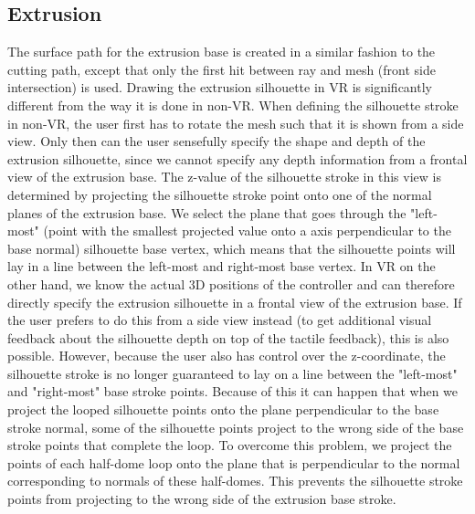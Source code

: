 \subsection{Extrusion}
The surface path for the extrusion base is created in a similar fashion to the cutting path, except that only the first hit between ray and mesh (front side intersection) is used.
Drawing the extrusion silhouette in VR is significantly different from the way it is done in non-VR. When defining the silhouette stroke in non-VR, the user first has to rotate the mesh such that it is shown from a side view. Only then can the user sensefully specify the shape and depth of the extrusion silhouette, since we cannot specify any depth information from a frontal view of the extrusion base. The z-value of the silhouette stroke in this view is determined by projecting the silhouette stroke point onto one of the normal planes of the extrusion base. We select the plane that goes through the "left-most" (point with the smallest projected value onto a axis perpendicular to the base normal) silhouette base vertex, which means that the silhouette points will lay in a line between the left-most and right-most base vertex. 
In VR on the other hand, we know the actual 3D positions of the controller and can therefore directly specify the extrusion silhouette in a frontal view of the extrusion base. If the user prefers to do this from a side view instead (to get additional visual feedback about the silhouette depth on top of the tactile feedback), this is also possible. However, because the user also has control over the z-coordinate, the silhouette stroke is no longer guaranteed to lay on a line between the "left-most" and "right-most" base stroke points. Because of this it can happen that when we project the looped silhouette points onto the plane perpendicular to the base stroke normal, some of the silhouette points project to the wrong side of the base stroke points that complete the loop. To overcome this problem, we project the points of each half-dome loop onto the plane that is perpendicular to the normal corresponding to normals of these half-domes. This prevents the silhouette stroke points from projecting to the wrong side of the extrusion base stroke.  

